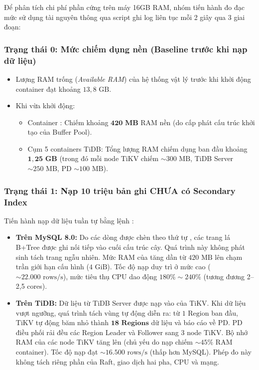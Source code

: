 Để phân tích chi phí phần cứng trên máy 16GB RAM, nhóm tiến hành đo đạc mức sử dụng tài nguyên thông qua script ghi log  liên tục mỗi 2 giây qua 3 giai đoạn:

\subsubsection{Trạng thái 0: Mức chiếm dụng nền (Baseline trước khi nạp dữ liệu)}
\begin{itemize}
  \item Lượng RAM trống (\textit{Available RAM}) của hệ thống vật lý trước khi khởi động container đạt khoảng $13,8\text{ GB}$.
  \item Khi vừa khởi động:
  \begin{itemize}
    \item Container : Chiếm khoảng $\mathbf{420\text{ MB}}$ RAM nền (do cấp phát cấu trúc khởi tạo của Buffer Pool).
    \item Cụm 5 containers TiDB: Tổng lượng RAM chiếm dụng ban đầu khoảng $\mathbf{1,25\text{ GB}}$ (trong đó mỗi node TiKV chiếm $\sim 300\text{ MB}$, TiDB Server $\sim 250\text{ MB}$, PD $\sim 100\text{ MB}$).
  \end{itemize}
\end{itemize}

\subsubsection{Trạng thái 1: Nạp 10 triệu bản ghi CHƯA có Secondary Index }
Tiến hành nạp dữ liệu tuần tự bằng lệnh :
\begin{itemize}
  \item \textbf{Trên MySQL 8.0:}
  Do các dòng được chèn theo thứ tự , các trang lá B+Tree được ghi nối tiếp vào cuối cấu trúc cây. Quá trình này không phát sinh tách trang ngẫu nhiên. Mức RAM của  tăng dần từ $420\text{ MB}$ lên chạm trần giới hạn cấu hình ($4\text{ GiB}$). Tốc độ nạp duy trì ở mức cao ($\sim 22.000\text{ rows/s}$), mức tiêu thụ CPU dao động $180\% \sim 240\%$ (tương đương 2--2,5 cores).
  \item \textbf{Trên TiDB:}
  Dữ liệu từ TiDB Server được nạp vào  của TiKV. Khi dữ liệu vượt ngưỡng, quá trình tách vùng tự động diễn ra: từ $1\text{ Region}$ ban đầu, TiKV tự động băm nhỏ thành $\mathbf{18\text{ Regions}}$ dữ liệu và báo cáo về PD. PD điều phối rải đều các Region Leader và Follower sang 3 node TiKV. Bộ nhớ RAM của các node TiKV tăng lên (chủ yếu do nạp  chiếm $\sim 45\%$ RAM container). Tốc độ nạp đạt $\sim 16.500\text{ rows/s}$ (thấp hơn MySQL). Phép đo này không tách riêng phần của Raft, giao dịch hai pha, CPU và mạng.
\end{itemize}

